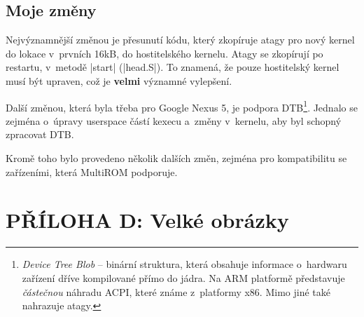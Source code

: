 \documentclass[12pt, a4paper, oneside]{article}
\newcommand{\B}{\textbf} %
\newcommand{\It}{\textit}  %
\begin{document}
\subsection*{Moje změny}
Nejvýznamnější změnou je přesunutí kódu, který zkopíruje atagy pro nový kernel do lokace v~prvních 16kB, do hostitelského kernelu. Atagy se zkopírují po restartu, v~metodě |start| (|head.S|). To znamená, že pouze hostitelský kernel musí být upraven, což je \B{velmi} významné vylepšení.

Další změnou, která byla třeba pro Google Nexus 5, je podpora DTB\footnote{\It{Device Tree Blob} -- binární struktura, která obsahuje informace o~hardwaru zařízení dříve kompilované přímo do jádra. Na ARM platformě představuje \It{částečnou} náhradu ACPI, které známe z~platformy x86. Mimo jiné také nahrazuje atagy.}. Jednalo se zejména o~úpravy userspace částí kexecu a~změny v~kernelu, aby byl schopný zpracovat DTB.

Kromě toho bylo provedeno několik dalších změn, zejména pro kompatibilitu se zařízeními, která MultiROM podporuje.


\newpage
 \section*{PŘÍLOHA D: Velké obrázky}
\end{document}
